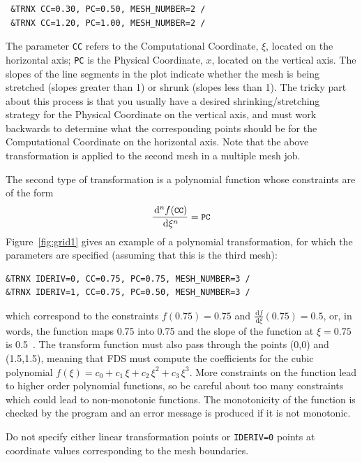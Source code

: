 \documentclass[11pt]{book}
\newcommand{\ct}{\tt\small}
\renewcommand{\d}{\,\mathrm{d}}
\begin{document}
\footnotesize
\begin{verbatim}
 &TRNX CC=0.30, PC=0.50, MESH_NUMBER=2 /
 &TRNX CC=1.20, PC=1.00, MESH_NUMBER=2 /
\end{verbatim} \normalsize

\noindent
The parameter {\ct CC} refers to the Computational Coordinate, $\xi$, located
on the horizontal axis; {\ct PC} is the Physical Coordinate, $x$, located on
the vertical axis.  The slopes of the
line segments in the plot indicate whether the mesh is being stretched (slopes greater
than 1) or shrunk (slopes less than 1). The tricky part about this
process is that you usually have a desired shrinking/stretching strategy
for the Physical Coordinate on the vertical axis, and must work backwards
to determine what the corresponding points should be for the Computational
Coordinate on the horizontal axis. Note that the above transformation is
applied to the second mesh in a multiple mesh job.

The second type of transformation is
a polynomial function whose constraints are of the form
$$ \frac{\d^n f(\hbox{\ct CC})}{\d\xi^n} = \hbox{\ct PC}   $$
Figure~\ref{fig:grid1} gives an example of a polynomial transformation, for which
the parameters are specified (assuming that this is the third mesh):

\footnotesize
\begin{verbatim}
&TRNX IDERIV=0, CC=0.75, PC=0.75, MESH_NUMBER=3 /
&TRNX IDERIV=1, CC=0.75, PC=0.50, MESH_NUMBER=3 /
\end{verbatim} \normalsize

\noindent
which correspond to the constraints
$f(0.75)=0.75$ and $\frac{\d f}{\d \xi}(0.75) = 0.5$, or, in words, the
function maps 0.75 into 0.75 and the slope of the function at
$\xi=0.75$ is 0.5~.
The transform function must also pass through the points (0,0) and (1.5,1.5), meaning that
FDS must compute the coefficients for the
cubic polynomial $f(\xi) = c_0 + c_1 \, \xi + c_2 \, \xi^2 + c_3 \, \xi^3$.
More constraints on the function lead to higher order polynomial functions, so be careful about too many constraints which could lead
to non-monotonic functions.
The monotonicity of the function is checked by the
program and an error message is produced if it is not monotonic.

\begin{warning}
\noindent
Do not specify either linear transformation points or {\ct IDERIV=0} points at coordinate values corresponding to
the mesh boundaries.
\end{warning}
\end{document}
